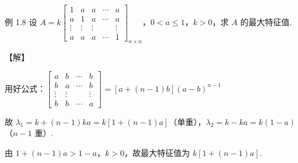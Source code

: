 \begin{fcard}{例 1.8}
设 $A=k\begin{bmatrix}
1 & a & a & \cdots & a\\
a & 1 & a & \cdots & a\\
\vdots & \vdots & \vdots & & \vdots\\
a & a & a & \cdots & 1
\end{bmatrix}_{n\times n}$，$0<a\leqslant 1$，$k>0$，求 $A$ 的最大特征值.

【解】

用好公式：$\begin{bmatrix}a & b & \cdots & b\\ b & a & \cdots & b\\ \vdots & \vdots & & \vdots\\ b & b & \cdots & a\end{bmatrix}=[a+(n-1)b](a-b)^{n-1}$

故 $\lambda_1=k+(n-1)ka=k[1+(n-1)a]$（单重），$\lambda_2=k-ka=k(1-a)$（$n-1$ 重）.

由 $1+(n-1)a>1-a$，$k>0$，故最大特征值为 $k[1+(n-1)a]$.
\end{fcard}
